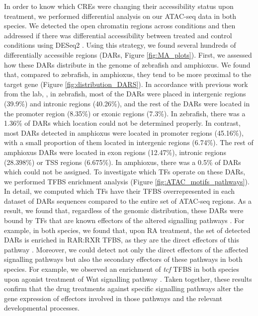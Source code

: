 In order to know which CREs were changing their accessibility status upon treatment, we performed differential analysis on our ATAC-seq data in both species. We detected the open chromatin regions across conditions and then addressed if there was differential accessibility between treated and control conditions using DESeq2 \parencite{love_moderated_2014}. Using this strategy, we found several hundreds of differentially accessible regions (DARs, Figure \ref{fig:MA_plots}). First, we assessed how these DARs distribute in the genome of zebrafish and amphioxus. We found that, compared to zebrafish, in amphioxus, they tend to be more proximal to the target gene (Figure \ref{fig:distribution_DARS}). In accordance with previous work from the lab, \parencite{marletaz_amphioxus_2018}, in zebrafish, most of the DARs were placed in intergenic regions (39.9\%) and intronic regions (40.26\%), and the rest of the DARs were located in the promoter region (8.35\%) or exonic regions (7.3\%). In zebrafish, there was a 1.36\% of DARs which location could not be determined properly.  In contrast, most DARs detected in amphioxus were located in promoter regions (45.16\%), with a small proportion of them located in intergenic regions (6.74\%). The rest of amphioxus DARs were located in exon regions (12.47\%), intronic regions (28.398\%) or TSS regions (6.675\%). In amphioxus, there was a 0.5\% of DARs which could not be assigned. To investigate which TFs operate on these DARs, we performed TFBS enrichment analysis (Figure \ref{fig:ATAC_motifs_pathways}). In detail, we computed which TFs have their TFBS overrepresented in each dataset of DARs sequences compared to the entire set of ATAC-seq regions. As a result, we found that, regardless of the genomic distribution, these DARs were bound by TFs that are known effectors of the altered signalling pathways \parencite{bottcher_fibroblast_2005, cadigan_tcflefs_2012, charney_gene_2017, bian_clock1a_2017, jia_smad2_2008, kjolby_integration_2019,tian_nodal_2006, friedman_foxa_2006, ghyselinck_retinoic_2019, hoodless_foxh1_2001, joshi_cdx4_2019, kjolby_genome-wide_2017, aldea_genetic_2019, onai_canonical_2019, yasuoka_evolution_2019}. For example, in both species, we found that, upon RA treatment, the set of detected DARs is enriched in RAR:RXR TFBS, as they are the direct effectors of this pathway \parencite{ghyselinck_retinoic_2019}. Moreover, we could detect not only the direct effectors of the affected signalling pathways but also the secondary effectors of these pathways in both species. For example, we observed an enrichment of \textit{tcf} TFBS in both species upon agonist treatment of Wnt signalling pathway \parencite{cadigan_tcflefs_2012,kjolby_genome-wide_2017,kjolby_integration_2019}. Taken together, these results confirm that the drug treatments against specific signalling pathways alter the gene expression of effectors involved in those pathways and the relevant developmental processes.

